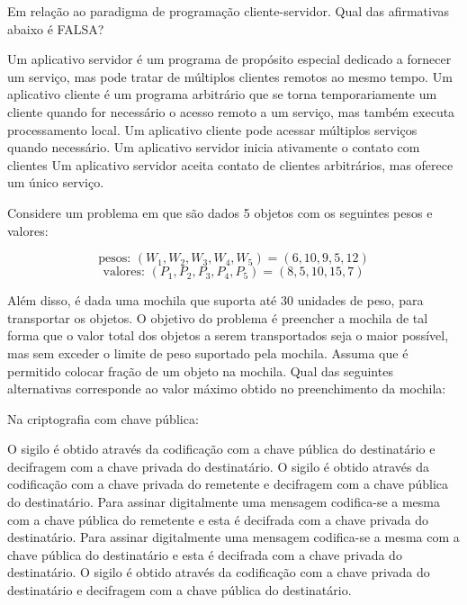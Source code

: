 \documentclass[12pt, addpoints]{exam}
\begin{document}
\begin{questions}
\question
Em relação ao paradigma de programação cliente-servidor. Qual das afirmativas abaixo é FALSA?
\begin{choices}
\choice Um aplicativo servidor é um programa de propósito especial dedicado a fornecer um serviço, mas pode tratar de múltiplos clientes remotos ao mesmo tempo. 
\choice Um aplicativo cliente é um programa arbitrário que se torna temporariamente um cliente quando for necessário o acesso remoto a um serviço, mas também executa processamento local.
\choice Um aplicativo cliente pode acessar múltiplos serviços quando necessário.
\choice Um aplicativo servidor inicia ativamente o contato com clientes 
\choice Um aplicativo servidor aceita contato de clientes arbitrários, mas oferece um único serviço. 
\end{choices}

\question
Considere um problema em que são dados 5 objetos com os seguintes pesos e valores:

\[
\text{pesos: } (W_1, W_2, W_3, W_4, W_5) = (6, 10, 9, 5, 12)
\]
\[
\text{valores: } (P_1, P_2, P_3, P_4, P_5) = (8, 5, 10, 15, 7)
\]

Além disso, é dada uma mochila que suporta até 30 unidades de peso, para transportar os objetos. O objetivo do problema é preencher a mochila de tal forma que o valor total dos objetos a serem transportados seja o maior possível, mas sem exceder o limite de peso suportado pela mochila. Assuma que é permitido colocar fração de um objeto na mochila. Qual das seguintes alternativas corresponde ao valor máximo obtido no preenchimento da mochila:
\begin{choices}
\end{choices}

\question
Na criptografia com chave pública:

\begin{choices}
\choice O sigilo é obtido através da codificação com a chave pública do destinatário e decifragem com a chave privada do destinatário.
\choice O sigilo é obtido através da codificação com a chave privada do remetente e decifragem com a chave pública do destinatário.
\choice Para assinar digitalmente uma mensagem codifica-se a mesma com a chave pública do remetente e esta é decifrada com a chave privada do destinatário.
\choice Para assinar digitalmente uma mensagem codifica-se a mesma com a chave pública do destinatário e esta é decifrada com a chave privada do destinatário.
\choice O sigilo é obtido através da codificação com a chave privada do destinatário e decifragem com a chave pública do destinatário.
\end{choices}


\end{questions}
\end{document}
